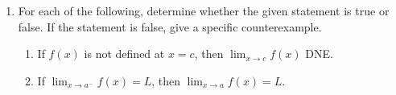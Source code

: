 \documentclass[12pt]{article}
\newif\ifans
\begin{document}
\begin{enumerate}
\item For each of the following, determine whether the given statement is true or false.  If the statement is false, give a specific counterexample.

\begin{enumerate}

\item If $f(x)$ is not defined at $x=c$, then $\lim_{x\rightarrow c}f(x)$ DNE.

\ifans{\fbox{\parbox{1\linewidth}{False.  For example, consider $f(x)=\left\{\begin{array}{ll}
1 & \text{if } x<0\\
1 & \text{if } x>0\end{array}\right.$.  Then, even though $f(0)$ is undefined, we have $\lim_{x\rightarrow 0}f(x)=1$.}}} \fi

\item If $\lim_{x\rightarrow a^-}f(x)=L$, then $\lim_{x\rightarrow a}f(x)=L$.

\ifans{\fbox{\parbox{1\linewidth}{False.  For example, consider $f(x)=\left\{\begin{array}{ll}
1 & \text{if } x<0\\
2 & \text{if } x>0\end{array}\right.$.  Then, $\lim_{x\rightarrow 0^-}f(x)=1$; but, $\lim_{x\rightarrow 0}f(x)$ DNE because $\lim_{x\rightarrow 0^+}f(x)=2\neq1$.}}} \fi

\end{enumerate}

\end{enumerate}
\end{document}
